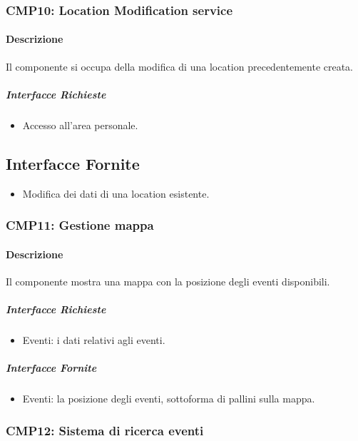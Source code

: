 \documentclass[9pt]{extarticle}
\begin{document}
\subsubsection*{CMP10: Location Modification service}
\paragraph{Descrizione}
Il componente si occupa della modifica di una location precedentemente creata.
\subparagraph{Interfacce Richieste}
\begin{itemize}
	\item Accesso all'area personale.
\end{itemize}
\subsection{Interfacce Fornite}
\begin{itemize}
	\item Modifica dei dati di una location esistente.
\end{itemize}

\subsubsection*{CMP11: Gestione mappa}
\paragraph{Descrizione}
Il componente mostra una mappa con la posizione degli eventi disponibili.
\subparagraph{Interfacce Richieste}
\begin{itemize}
	\item Eventi: i dati relativi agli eventi.
\end{itemize}
\subparagraph{Interfacce Fornite}
\begin{itemize}
	\item Eventi: la posizione degli eventi, sottoforma di pallini sulla mappa.
\end{itemize}

\subsubsection*{CMP12: Sistema di ricerca eventi}
\end{document}
